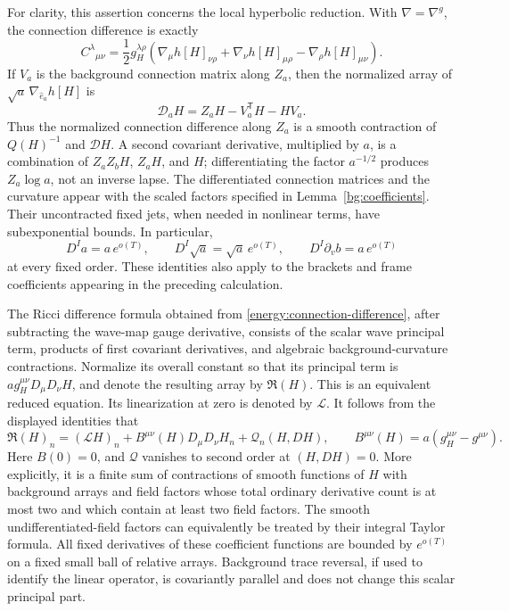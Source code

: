 For clarity, this assertion concerns the local hyperbolic reduction.
With \(\nabla=\nabla^g\), the connection difference is exactly
\begin{equation}\label{energy:connection-difference}
 C^\lambda{}_{\mu\nu}
 =\frac12 g_H^{\lambda\rho}
       (\nabla_\mu h[H]_{\nu\rho}
        +\nabla_\nu h[H]_{\mu\rho}
        -\nabla_\rho h[H]_{\mu\nu}).
\end{equation}
If \(V_a\) is the background connection matrix along \(Z_a\), then
the normalized array of \(\sqrt a\,\nabla_{\hat e_a}h[H]\) is
\[
 \mathcal D_aH=Z_aH-V_a^{\mathsf T}H-HV_a.
\]
Thus the normalized connection difference along \(Z_a\) is a smooth
contraction of \(Q(H)^{-1}\) and \(\mathcal D H\). A second covariant
derivative, multiplied by \(a\), is a combination of
\(Z_aZ_bH\), \(Z_aH\), and \(H\); differentiating the factor
\(a^{-1/2}\) produces \(Z_a\log a\), not an inverse lapse.
The differentiated connection matrices and the curvature appear with
the scaled factors specified in Lemma~\ref{bg:coefficients}. Their
uncontracted fixed jets, when needed in nonlinear terms, have
subexponential bounds. In particular,
\[
 D^Ia=a\,e^{o(T)},\qquad
 D^I\sqrt a=\sqrt a\,e^{o(T)},\qquad
 D^I\partial_vb=a\,e^{o(T)}
\]
at every fixed order. These identities also apply to the brackets and
frame coefficients appearing in the preceding calculation.

The Ricci difference formula obtained from
\eqref{energy:connection-difference}, after subtracting the wave-map
gauge derivative, consists of the scalar wave principal term, products
of first covariant derivatives, and algebraic background-curvature
contractions. Normalize its overall constant so that its principal
term is \(a g_H^{\mu\nu}D_\mu D_\nu H\), and denote the resulting
array by \(\mathfrak R(H)\). This is an equivalent reduced equation.
Its linearization at zero is denoted by \(\mathcal L\). It follows
from the displayed identities that
\begin{equation}\label{energy:reduced-structure}
 \mathfrak R(H)_n=(\mathcal L H)_n
       +B^{\mu\nu}(H)D_\mu D_\nu H_n
       +\mathcal Q_n(H,DH),\qquad
 B^{\mu\nu}(H)=a(g_H^{\mu\nu}-g^{\mu\nu}).
\end{equation}
Here \(B(0)=0\), and \(\mathcal Q\) vanishes to second order at
\((H,DH)=0\). More explicitly, it is a finite sum of contractions of
smooth functions of \(H\) with background arrays and field factors
whose total ordinary derivative count is at most two and which contain
at least two field factors. The smooth undifferentiated-field factors
can equivalently be treated by their integral Taylor formula. All
fixed derivatives of these coefficient functions are bounded by
\(e^{o(T)}\) on a fixed small ball of relative arrays. Background
trace reversal, if used to identify the linear operator, is
covariantly parallel and does not change this scalar principal part.

